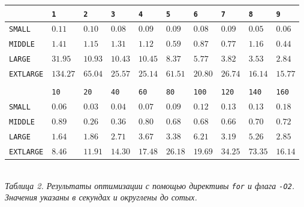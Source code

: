 \documentclass[a4paper, 11pt]{article}
\begin{document}
\begin{center}
    \begin{tabular}{l | l l l l l l l l l}
        & \texttt{1} & \texttt{2} & \texttt{3} & \texttt{4} & \texttt{5} & \texttt{6} & \texttt{7} & \texttt{8} & \texttt{9} \\
        \hline
        \texttt{SMALL}    & $0.11$ & $0.10$ & $0.08$ & $0.09$ & $0.09$ & $0.08$ & $0.09$ & $0.05$ & $0.06$ \\
        \texttt{MIDDLE}   & $1.41$ & $1.15$ & $1.31$ & $1.12$ & $0.59$ & $0.87$ & $0.77$ & $1.16$ & $0.44$ \\
        \texttt{LARGE}    & $31.95$ & $10.93$ & $10.43$ & $10.45$ & $8.37$ & $5.77$ & $3.82$ & $3.53$ & $2.84$ \\
        \texttt{EXTLARGE} & $134.27$ & $65.04$ & $25.57$ & $25.14$ & $61.51$ & $20.80$ & $26.74$ & $16.14$ & $15.77$ \\
        \vspace{0.4cm}\\
        & \texttt{10} & \texttt{20} & \texttt{40} & \texttt{60} & \texttt{80} & \texttt{100} & \texttt{120} & \texttt{140} & \texttt{160} \\
        \hline
        \texttt{SMALL}    & $0.06$ & $0.03$ & $0.04$ & $0.07$ & $0.09$ & $0.12$ & $0.13$ & $0.13$ & $0.18$ \\
        \texttt{MIDDLE}   & $0.89$ & $0.26$ & $0.36$ & $0.80$ & $0.68$ & $0.68$ & $0.66$ & $0.70$ & $0.72$ \\
        \texttt{LARGE}    & $1.64$ & $1.86$ & $2.71$ & $3.67$ & $3.38$ & $6.21$ & $3.19$ & $5.26$ & $2.85$ \\
        \texttt{EXTLARGE} & $8.46$ & $11.91$ & $14.30$ & $17.48$ & $26.18$ & $19.69$ & $34.25$ & $73.35$ & $16.14$ \\
    \end{tabular}\\
    \vspace{0.3cm}
    \small \it
    Таблица 2. Результаты оптимизации с помощью директивы \texttt{for} и флага \texttt{-O2}. Значения указаны в секундах и округлены до сотых.
\end{center}
\newpage
\end{document}
